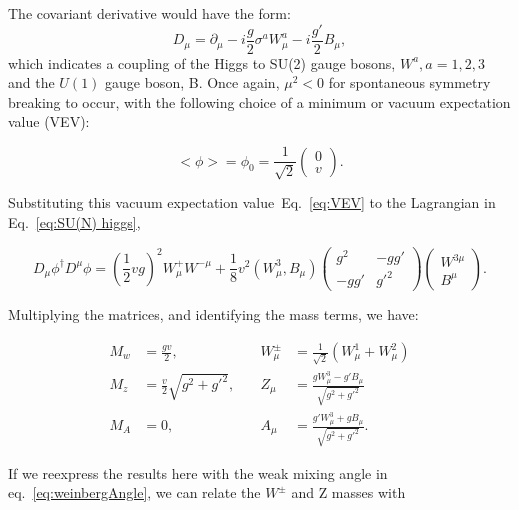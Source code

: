 The covariant derivative would have the form:
\begin{equation}
\label{eq:HiggsCov}
D_{\mu} = \partial_\mu - i\frac{g}{2}\sigma^aW^a_{\mu}-i\frac{g'}{2}B_\mu,
\end{equation}
which indicates a coupling of the Higgs to SU(2) gauge bosons, $W^a, a= 1,2,3 $ and the $U(1)$ gauge boson, B. Once again, $\mu^2 < 0$ for spontaneous symmetry breaking to occur, with the following choice of a minimum or vacuum expectation value (VEV):

\begin{equation}
\label{eq:VEV}
<\phi> = \phi_0 = \frac{1}{\sqrt{2}}\begin{pmatrix}
         0 \\
         v
        \end{pmatrix}.
\end{equation}

Substituting this vacuum expectation value~Eq.~\ref{eq:VEV} to the Lagrangian in Eq.~\ref{eq:SU(N) higgs}, 

\begin{equation}
\label{eq:MassesLagrangian}
D_{\mu}\phi^{\dagger}D^{\mu}\phi  = (\frac{1}{2}vg)^2W^+_{\mu}W^{-\mu} + \frac{1}{8}v^2 (W^3_{\mu}, B_{\mu})\begin{pmatrix}
    g^2  & -gg' \\
    -gg' & g'^2
\end{pmatrix}
\begin{pmatrix}
    W^{3\mu} \\
    B^{\mu}
\end{pmatrix}.
\end{equation}

Multiplying the matrices, and identifying the mass terms, we have:

\begin{equation}
\label{eq:BosonMasses}
\begin{aligned}
M_w &= \frac{gv}{2}, \quad &W^{\pm}_{\mu} &= \frac{1}{\sqrt{2}}(W^1_{\mu} + W^2_{\mu}) \\
M_z &= \frac{v}{2}\sqrt{g^2+g'^2}, \quad &Z_{\mu} &= \frac{gW^3_{\mu} - g'B_{\mu}}{\sqrt{g^2+ g'^2}} \\
M_A &= 0, \quad &A_{\mu} &= \frac{g'W^3_{\mu} + gB_{\mu}}{\sqrt{g^2+ g'^2}}.
\end{aligned}
\end{equation}

If we reexpress the results here with the weak mixing angle in eq.~\ref{eq:weinbergAngle}, we can relate the $W^{\pm}$ and Z masses with

